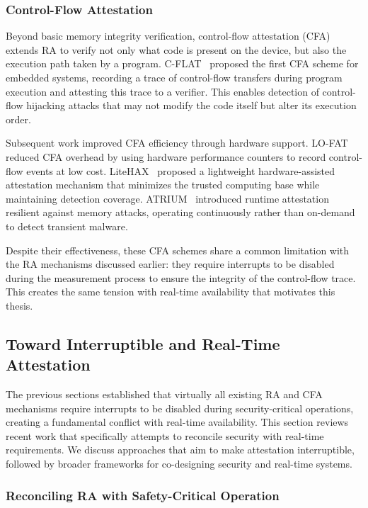 \documentclass[a4paper,10pt]{article}
\begin{document}
\subsubsection{Control-Flow Attestation}

Beyond basic memory integrity verification, control-flow
attestation (CFA) extends RA to verify not only what code is
present on the device, but also the execution path taken by a
program. C-FLAT~\cite{abera2016cflat} proposed the first CFA scheme
for embedded systems, recording a trace of control-flow transfers
during program execution and attesting this trace to a verifier.
This enables detection of control-flow hijacking attacks that may
not modify the code itself but alter its execution order.

Subsequent work improved CFA efficiency through hardware support.
LO-FAT~\cite{lo-fat} reduced CFA overhead by using hardware
performance counters to record control-flow events at low cost.
LiteHAX~\cite{litehax} proposed a lightweight hardware-assisted
attestation mechanism that minimizes the trusted computing base
while maintaining detection coverage. ATRIUM~\cite{atrium}
introduced runtime attestation resilient against memory attacks,
operating continuously rather than on-demand to detect transient
malware.

Despite their effectiveness, these CFA schemes share a common
limitation with the RA mechanisms discussed earlier: they require
interrupts to be disabled during the measurement process to ensure
the integrity of the control-flow trace. This creates the same
tension with real-time availability that motivates this thesis.


\subsection{Toward Interruptible and Real-Time Attestation}

The previous sections established that virtually all existing RA and CFA mechanisms require interrupts to be disabled during security-critical operations, creating a fundamental conflict with real-time availability. This section reviews recent work that specifically attempts to reconcile security with real-time requirements. We discuss approaches that aim to make attestation interruptible, followed by broader frameworks for co-designing security and real-time systems.

\subsubsection{Reconciling RA with Safety-Critical Operation}
\end{document}

